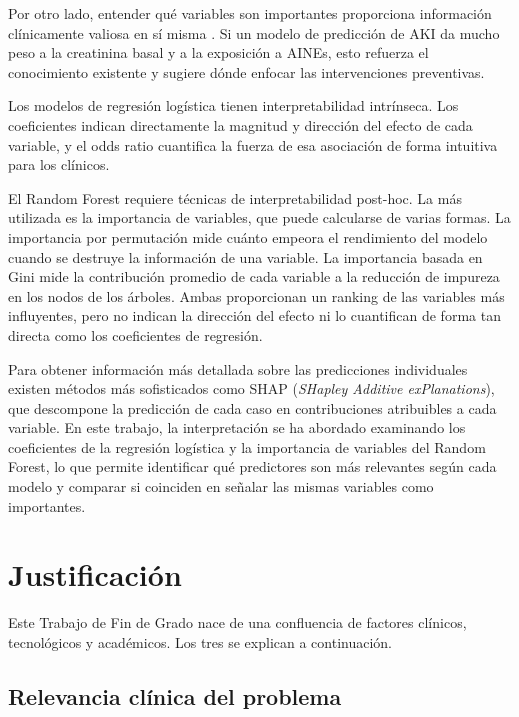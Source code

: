 \documentclass[12pt, a4paper, oneside]{report}
\begin{document}
Por otro lado, entender qué variables son importantes proporciona información clínicamente valiosa en sí misma \parencite{murdoch2019interpretable}. Si un modelo de predicción de AKI da mucho peso a la creatinina basal y a la exposición a AINEs, esto refuerza el conocimiento existente y sugiere dónde enfocar las intervenciones preventivas.

Los modelos de regresión logística tienen interpretabilidad intrínseca. Los coeficientes indican directamente la magnitud y dirección del efecto de cada variable, y el odds ratio cuantifica la fuerza de esa asociación de forma intuitiva para los clínicos.

El Random Forest requiere técnicas de interpretabilidad post-hoc. La más utilizada es la importancia de variables, que puede calcularse de varias formas. La importancia por permutación mide cuánto empeora el rendimiento del modelo cuando se destruye la información de una variable. La importancia basada en Gini mide la contribución promedio de cada variable a la reducción de impureza en los nodos de los árboles. Ambas proporcionan un ranking de las variables más influyentes, pero no indican la dirección del efecto ni lo cuantifican de forma tan directa como los coeficientes de regresión.

Para obtener información más detallada sobre las predicciones individuales existen métodos más sofisticados como SHAP (\textit{SHapley Additive exPlanations}), que descompone la predicción de cada caso en contribuciones atribuibles a cada variable. En este trabajo, la interpretación se ha abordado examinando los coeficientes de la regresión logística y la importancia de variables del Random Forest, lo que permite identificar qué predictores son más relevantes según cada modelo y comparar si coinciden en señalar las mismas variables como importantes.

\chapter{Justificación}
\label{chap:justificacion}

Este Trabajo de Fin de Grado nace de una confluencia de factores clínicos, tecnológicos y académicos. Los tres se explican a continuación.

\section{Relevancia clínica del problema}
\label{sec:relevancia}
\end{document}
